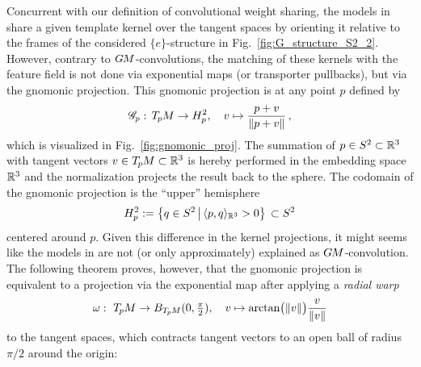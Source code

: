 Concurrent with our definition of convolutional weight sharing, the models in \cite{coors2018spherenet,zhao2018distortion,tateno2018distortion,eder2019convolutions,martin2020panoramic} share a given template kernel over the tangent spaces by orienting it relative to the frames of the considered $\{e\}$-structure in Fig.~\ref{fig:G_structure_S2_2}.
However, contrary to $G\mkern-1.4muM$-convolutions, the matching of these kernels with the feature field is not done via exponential maps (or transporter pullbacks), but via the gnomonic projection.
This gnomonic projection is at any point $p$ defined by
\begin{align}\label{eq:gnomonic_proj_def}
    \mathscr{G}_p:\, T_{\mkern-1.5mu p}\mkern-.5muM \to H_p^2, \quad v \mapsto \frac{p+v}{\lVert p+v\rVert} \,,
\end{align}
which is visualized in Fig.~\ref{fig:gnomonic_proj}.
The summation of $p\in S^2 \subset \mathbb{R}^3$ with tangent vectors $v \in T_{\mkern-1.5mu p}\mkern-.5muM \subset \mathbb{R}^3$ is hereby performed in the embedding space $\mathbb{R}^3$ and the normalization projects the result back to the sphere. %
The codomain of the gnomonic projection is the ``upper'' hemisphere
\begin{align}\label{eq:upper_hemisphere_def}
    H_p^2 := \big\{ q\in S^2 \,\big|\, \langle p,q\rangle_{\mathbb{R}^3} > 0 \big\} \,\subset S^2
\end{align}
centered around $p$.
Given this difference in the kernel projections, it might seems like the models in \cite{coors2018spherenet,zhao2018distortion,tateno2018distortion,eder2019convolutions,martin2020panoramic} are not (or only approximately) explained as $G\mkern-1.4muM$-convolution.
The following theorem proves, however, that the gnomonic projection is equivalent to a projection via the exponential map after applying a \emph{radial warp}
\begin{align}\label{eq:radial_warp}
    \omega:\ T_{\mkern-1.5mu p}\mkern-.5muM \to B_{T_{\mkern-1.5mu p}\mkern-.5muM}(0,{\textstyle\frac{\pi}{2}}), \quad
    v \mapsto \arctan\! \big(\lVert v\rVert\big) \frac{v}{\lVert v\rVert}
\end{align}
to the tangent spaces, which contracts tangent vectors to an open ball of radius $\pi/2$ around the origin:
